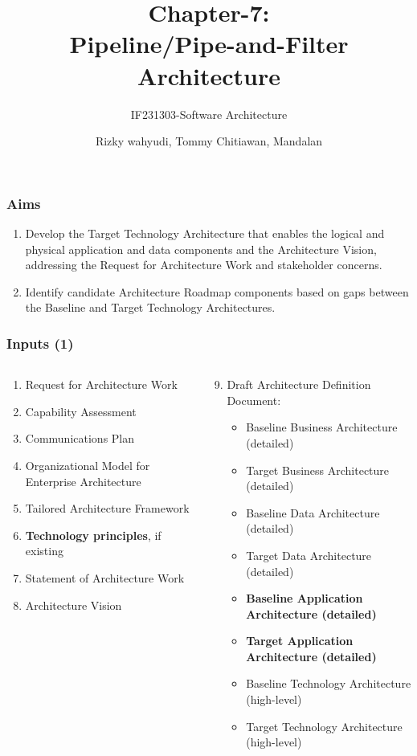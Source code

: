 \documentclass[aspectratio=169, table]{beamer}
\title{\Large Chapter-7:\\Pipeline/Pipe-and-Filter\\Architecture}
\subtitle{IF231303-Software Architecture}
\author{Rizky wahyudi, Tommy Chitiawan, Mandalan}
\begin{document}
	\frame{\titlepage}

	\begin{frame}
		\frametitle{Aims}
		\begin{enumerate}
			\item Develop the Target Technology Architecture that enables the logical and physical application and data components and the Architecture Vision, addressing the Request for Architecture Work and stakeholder concerns.
			\item Identify candidate Architecture Roadmap components based on gaps between the Baseline and Target Technology Architectures.
		\end{enumerate}
	\end{frame}

	\begin{frame}
		\frametitle{Inputs (1)}
		\vspace{20pt}
		\begin{columns}[onlytextwidth]
			\begin{column}{0.45\textwidth}
				\begin{enumerate}
					\item Request for Architecture Work
					\item Capability Assessment
					\item Communications Plan
					\item Organizational Model for Enterprise Architecture
					\item Tailored Architecture Framework
					\item \textbf{Technology principles}, if existing
					\item Statement of Architecture Work
					\item Architecture Vision
				\end{enumerate}
			\end{column}
			\begin{column}{0.55\textwidth}
				\begin{enumerate}
					\setcounter{enumi}{8}
					\item Draft Architecture Definition Document:
					\begin{itemize}
						\item Baseline Business Architecture (detailed)
						\item Target Business Architecture (detailed)
						\item Baseline Data Architecture (detailed)
						\item Target Data Architecture (detailed)
						\item \textbf{Baseline Application Architecture (detailed)}
						\item \textbf{Target Application Architecture (detailed)}
						\item Baseline Technology Architecture (high-level)
						\item Target Technology Architecture (high-level)
					\end{itemize}
				\end{enumerate}
			\end{column}
		\end{columns}
	\end{frame}
\end{document}
